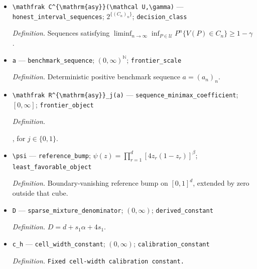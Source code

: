 \documentclass{article}
\begin{document}
\begin{itemize}
  \item \texttt{\textbackslash{}\allowbreak{}mathfrak C\textasciicircum{}\{\textbackslash{}\allowbreak{}mathrm\{asy\}\allowbreak{}\}\allowbreak{}(\textbackslash{}\allowbreak{}mathcal U,\allowbreak{}\textbackslash{}\allowbreak{}gamma)} --- \texttt{honest\_\allowbreak{}interval\_\allowbreak{}sequences}; \(2^{\{(C_n)_n\}}\); \texttt{decision\_\allowbreak{}class}
  \par\smallskip\noindent\emph{Definition.} Sequences satisfying \(\liminf_{n\to\infty}\inf_{P\in\mathcal U}P^n\{V(P)\in C_n\}\ge1-\gamma\).
  \item \texttt{a} --- \texttt{benchmark\_\allowbreak{}sequence}; \((0,\infty)^{\mathbb N}\); \texttt{frontier\_\allowbreak{}scale}
  \par\smallskip\noindent\emph{Definition.} Deterministic positive benchmark sequence \(a=(a_n)_n\).
  \item \texttt{\textbackslash{}\allowbreak{}mathfrak R\textasciicircum{}\{\textbackslash{}\allowbreak{}mathrm\{asy\}\allowbreak{}\}\allowbreak{}\_\allowbreak{}j(a)} --- \texttt{sequence\_\allowbreak{}minimax\_\allowbreak{}coefficient}; \([0,\infty]\); \texttt{frontier\_\allowbreak{}object}
  \par\smallskip\noindent\emph{Definition.} \par\noindent {}\par\noindent, for \(j\in\{0,1\}\).
  \item \texttt{\textbackslash{}\allowbreak{}psi} --- \texttt{reference\_\allowbreak{}bump}; \(\psi(z)=\prod_{r=1}^d[4z_r(1-z_r)]^{\beta}\); \texttt{least\_\allowbreak{}favorable\_\allowbreak{}object}
  \par\smallskip\noindent\emph{Definition.} Boundary-vanishing reference bump on \( [0,1]^d\), extended by zero outside that cube.
  \item \texttt{D} --- \texttt{sparse\_\allowbreak{}mixture\_\allowbreak{}denominator}; \((0,\infty)\); \texttt{derived\_\allowbreak{}constant}
  \par\smallskip\noindent\emph{Definition.} \(D=d+s_1\alpha+4s_1\).
  \item \texttt{c\_\allowbreak{}h} --- \texttt{cell\_\allowbreak{}width\_\allowbreak{}constant}; \((0,\infty)\); \texttt{calibration\_\allowbreak{}constant}
  \par\smallskip\noindent\emph{Definition.} \texttt{Fixed cell-\allowbreak{}width calibration constant.}

\end{itemize}
\end{document}

